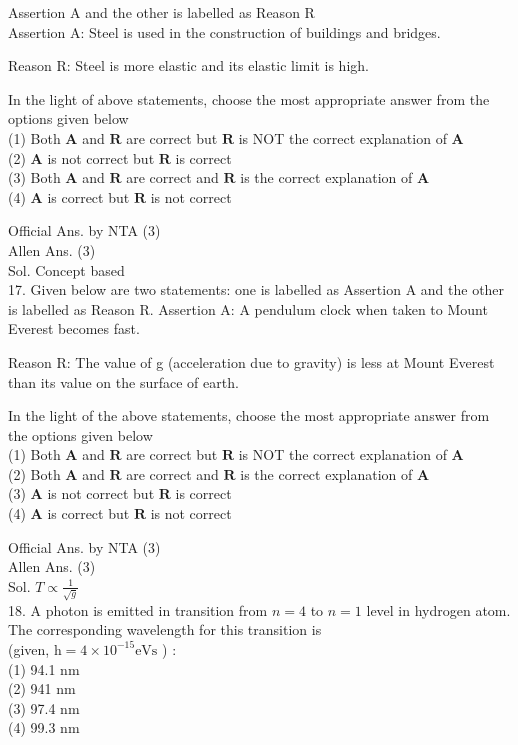 \documentclass[10pt]{article}
\begin{document}
Assertion A and the other is labelled as Reason R\\
Assertion A: Steel is used in the construction of buildings and bridges.

Reason R: Steel is more elastic and its elastic limit is high.

In the light of above statements, choose the most appropriate answer from the options given below\\
(1) Both \(\mathbf{A}\) and \(\mathbf{R}\) are correct but \(\mathbf{R}\) is NOT the correct explanation of \(\mathbf{A}\)\\
(2) \(\mathbf{A}\) is not correct but \(\mathbf{R}\) is correct\\
(3) Both \(\mathbf{A}\) and \(\mathbf{R}\) are correct and \(\mathbf{R}\) is the correct explanation of \(\mathbf{A}\)\\
(4) \(\mathbf{A}\) is correct but \(\mathbf{R}\) is not correct

Official Ans. by NTA (3)\\
Allen Ans. (3)\\
Sol. Concept based\\
17. Given below are two statements: one is labelled as Assertion A and the other is labelled as Reason R. Assertion A: A pendulum clock when taken to Mount Everest becomes fast.

Reason R: The value of g (acceleration due to gravity) is less at Mount Everest than its value on the surface of earth.

In the light of the above statements, choose the most appropriate answer from the options given below\\
(1) Both \(\mathbf{A}\) and \(\mathbf{R}\) are correct but \(\mathbf{R}\) is NOT the correct explanation of \(\mathbf{A}\)\\
(2) Both \(\mathbf{A}\) and \(\mathbf{R}\) are correct and \(\mathbf{R}\) is the correct explanation of \(\mathbf{A}\)\\
(3) \(\mathbf{A}\) is not correct but \(\mathbf{R}\) is correct\\
(4) \(\mathbf{A}\) is correct but \(\mathbf{R}\) is not correct

Official Ans. by NTA (3)\\
Allen Ans. (3)\\
Sol. \(T \propto \frac{1}{\sqrt{g}}\)\\
18. A photon is emitted in transition from \(n=4\) to \(n=1\) level in hydrogen atom. The corresponding wavelength for this transition is\\
(given, \(\mathrm{h}=4 \times 10^{-15} \mathrm{eVs}\) ) :\\
(1) 94.1 nm\\
(2) 941 nm\\
(3) 97.4 nm\\
(4) 99.3 nm
\end{document}
